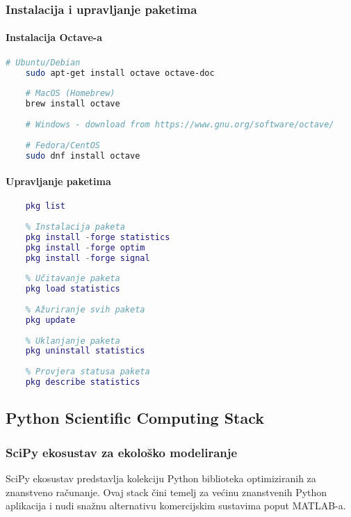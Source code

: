 \documentclass[11pt,oneside]{book}
\begin{document}
\subsubsection{Instalacija i upravljanje paketima}

\paragraph{Instalacija Octave-a}

\begin{lstlisting}[language=bash, caption=Instalacija GNU Octave]
	# Ubuntu/Debian
	sudo apt-get install octave octave-doc
	
	# MacOS (Homebrew)
	brew install octave
	
	# Windows - download from https://www.gnu.org/software/octave/
	
	# Fedora/CentOS
	sudo dnf install octave
\end{lstlisting}

\paragraph{Upravljanje paketima}

\begin{lstlisting}[language=Matlab, caption=Octave package management]
	% Lista dostupnih paketa
	pkg list
	
	% Instalacija paketa
	pkg install -forge statistics
	pkg install -forge optim
	pkg install -forge signal
	
	% Učitavanje paketa
	pkg load statistics
	
	% Ažuriranje svih paketa
	pkg update
	
	% Uklanjanje paketa
	pkg uninstall statistics
	
	% Provjera statusa paketa
	pkg describe statistics
\end{lstlisting}

\subsection{Python Scientific Computing Stack}

\subsubsection{SciPy ekosustav za ekološko modeliranje}

SciPy ekosustav predstavlja kolekciju Python biblioteka optimiziranih za znanstveno računanje. Ovaj stack čini temelj za većinu znanstvenih Python aplikacija i nudi snažnu alternativu komercijskim sustavima poput MATLAB-a.
\end{document}
